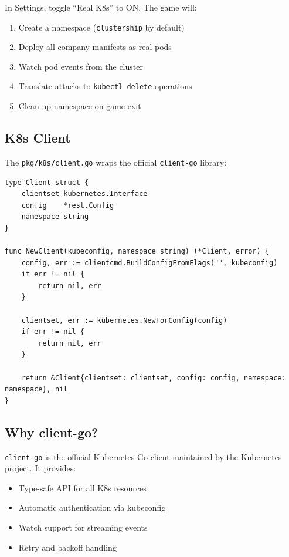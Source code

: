 \documentclass[11pt]{article}
\begin{document}
In Settings, toggle ``Real K8s'' to ON. The game will:
\begin{enumerate}
    \item Create a namespace (\texttt{clustership} by default)
    \item Deploy all company manifests as real pods
    \item Watch pod events from the cluster
    \item Translate attacks to \texttt{kubectl delete} operations
    \item Clean up namespace on game exit
\end{enumerate}

\subsection{K8s Client}

The \texttt{pkg/k8s/client.go} wraps the official \texttt{client-go} library:

\begin{lstlisting}
type Client struct {
    clientset kubernetes.Interface
    config    *rest.Config
    namespace string
}

func NewClient(kubeconfig, namespace string) (*Client, error) {
    config, err := clientcmd.BuildConfigFromFlags("", kubeconfig)
    if err != nil {
        return nil, err
    }

    clientset, err := kubernetes.NewForConfig(config)
    if err != nil {
        return nil, err
    }

    return &Client{clientset: clientset, config: config, namespace: namespace}, nil
}
\end{lstlisting}

\subsection{Why client-go?}

\texttt{client-go} is the official Kubernetes Go client maintained by the Kubernetes project. It provides:
\begin{itemize}
    \item Type-safe API for all K8s resources
    \item Automatic authentication via kubeconfig
    \item Watch support for streaming events
    \item Retry and backoff handling
\end{itemize}
\end{document}
